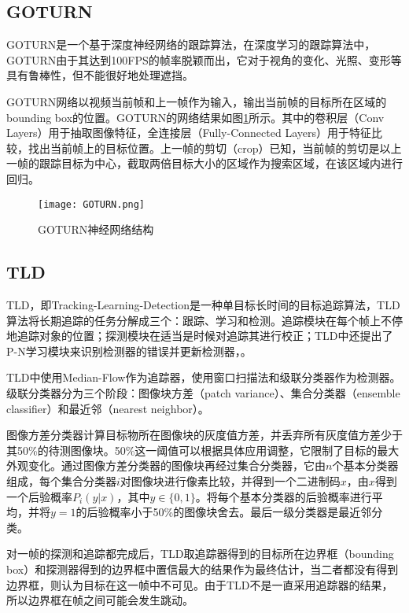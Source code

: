 \subsection{GOTURN}

  GOTURN是一个基于深度神经网络的跟踪算法\cite{held2016learning}，在深度学习的跟踪算法中，GOTURN由于其达到100FPS的帧率脱颖而出，它对于视角的变化、光照、变形等具有鲁棒性，但不能很好地处理遮挡。

  GOTURN网络以视频当前帧和上一帧作为输入，输出当前帧的目标所在区域的bounding box的位置。GOTURN的网络结果如图\ref{fig:GOTURN}所示。其中的卷积层（Conv Layers）用于抽取图像特征，全连接层（Fully-Connected Layers）用于特征比较，找出当前帧上的目标位置。上一帧的剪切（crop）已知，当前帧的剪切是以上一帧的跟踪目标为中心，截取两倍目标大小的区域作为搜索区域，在该区域内进行回归。

\begin{figure}[htb]
  \centering
  \texttt{[image: GOTURN.png]}
  \caption{GOTURN神经网络结构}
  \label{fig:GOTURN}
\end{figure}

\subsection{TLD}

  TLD，即Tracking-Learning-Detection是一种单目标长时间的目标追踪算法，TLD算法将长期追踪的任务分解成三个：跟踪、学习和检测。追踪模块在每个帧上不停地追踪对象的位置；探测模块在适当是时候对追踪其进行校正；TLD中还提出了P-N学习模块来识别检测器的错误并更新检测器，\cite{kalal2012tracking}。

  TLD中使用Median-Flow作为追踪器，使用窗口扫描法和级联分类器作为检测器。级联分类器分为三个阶段：图像块方差（patch variance）、集合分类器（ensemble classifier）和最近邻（nearest neighbor）。

  图像方差分类器计算目标物所在图像块的灰度值方差，并丢弃所有灰度值方差少于其50\%的待测图像块。50\%这一阈值可以根据具体应用调整，它限制了目标的最大外观变化。通过图像方差分类器的图像块再经过集合分类器，它由$n$个基本分类器组成，每个集合分类器$i$对图像块进行像素比较，并得到一个二进制码$x$，由$x$得到一个后验概率$P_i(y|x)$，其中$y\in\{0,1\}$。将每个基本分类器的后验概率进行平均，并将$y=1$的后验概率小于50\%的图像块舍去。最后一级分类器是最近邻分类。

  对一帧的探测和追踪都完成后，TLD取追踪器得到的目标所在边界框（bounding box）和探测器得到的边界框中置信最大的结果作为最终估计，当二者都没有得到边界框，则认为目标在这一帧中不可见。由于TLD不是一直采用追踪器的结果，所以边界框在帧之间可能会发生跳动。

